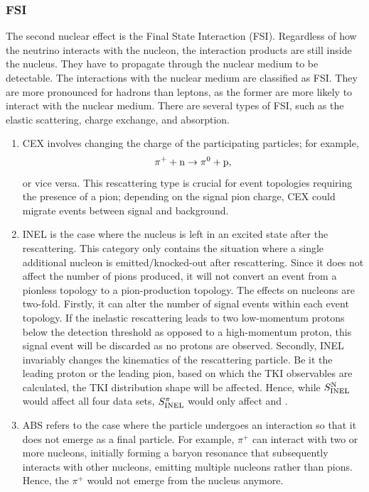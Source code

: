    \subsubsection{FSI}
    \label{sec:nuint-fsi}
    The second nuclear effect is the Final State Interaction (FSI).
    Regardless of how the neutrino interacts with the nucleon, the interaction products are still inside the nucleus.
    They have to propagate through the nuclear medium to be detectable.
    The interactions with the nuclear medium are classified as FSI.
    They are more pronounced for hadrons than leptons, as the former are more likely to interact with the nuclear medium.
    There are several types of FSI, such as the elastic scattering, charge exchange, and absorption.
    \begin{enumerate}
        \item 
    CEX involves changing the charge of the participating particles; for example,
    \begin{equation}
        \pi^+ + \textrm{n} \rightarrow \pi^0 + \textrm{p},
    \end{equation}
    or vice versa. This rescattering type is crucial for event topologies requiring the presence of a pion;  depending on the signal pion charge, CEX could migrate events between signal and background. 
  
    \item 
    INEL is the case where the nucleus is left in an excited state after the rescattering. This category only contains the situation where a single additional nucleon is emitted/knocked-out after rescattering. Since it does not affect the number of pions produced, it will not convert an event from a pionless topology to a pion-production topology. The effects on nucleons are two-fold. Firstly, it can alter the number of signal events within each event topology. If the inelastic rescattering leads to two low-momentum protons below the detection threshold as opposed to a high-momentum proton, this signal event will be discarded as no protons are observed. Secondly, INEL invariably changes the kinematics of the rescattering particle. Be it the leading proton or the leading pion, based on which the TKI observables are calculated, the TKI distribution shape will be affected. Hence, while $S_\textrm{INEL}^\textrm{N}$ would affect all four data sets, $S_\textrm{INEL}^{\pi}$ would only affect \ttkpip and \minpiz. 
  
    \item 
    ABS refers to the case where the particle undergoes an interaction so that it does not emerge as a final particle. For example, $\pi^+$ can interact with two or more nucleons, initially forming a baryon resonance that subsequently interacts with other nucleons, emitting multiple nucleons rather than pions. Hence, the $\pi^+$ would not emerge from the nucleus anymore.
  

\end{enumerate}
